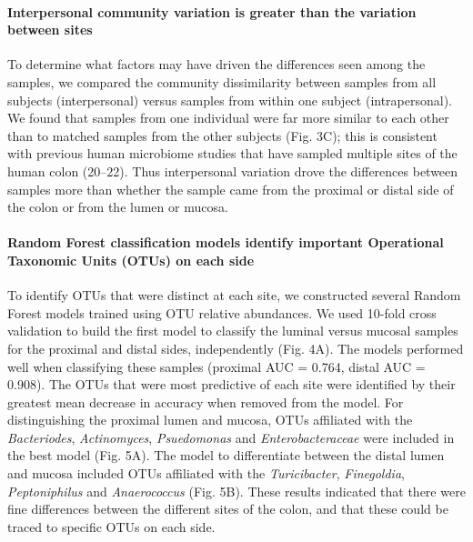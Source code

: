 \documentclass[12pt,]{article}
\let\oldparagraph\paragraph
\renewcommand{\paragraph}[1]{\oldparagraph{#1}\mbox{}}
\begin{document}
\paragraph{Interpersonal community variation is greater than the
variation between
sites}\label{interpersonal-community-variation-is-greater-than-the-variation-between-sites}

To determine what factors may have driven the differences seen among the
samples, we compared the community dissimilarity between samples from
all subjects (interpersonal) versus samples from within one subject
(intrapersonal). We found that samples from one individual were far more
similar to each other than to matched samples from the other subjects
(Fig. 3C); this is consistent with previous human microbiome studies
that have sampled multiple sites of the human colon (20--22). Thus
interpersonal variation drove the differences between samples more than
whether the sample came from the proximal or distal side of the colon or
from the lumen or mucosa.

\paragraph{Random Forest classification models identify important
Operational Taxonomic Units (OTUs) on each
side}\label{random-forest-classification-models-identify-important-operational-taxonomic-units-otus-on-each-side}

To identify OTUs that were distinct at each site, we constructed several
Random Forest models trained using OTU relative abundances. We used
10-fold cross validation to build the first model to classify the
luminal versus mucosal samples for the proximal and distal sides,
independently (Fig. 4A). The models performed well when classifying
these samples (proximal AUC = 0.764, distal AUC = 0.908). The OTUs that
were most predictive of each site were identified by their greatest mean
decrease in accuracy when removed from the model. For distinguishing the
proximal lumen and mucosa, OTUs affiliated with the \emph{Bacteriodes},
\emph{Actinomyces}, \emph{Psuedomonas} and \emph{Enterobacteraceae} were
included in the best model (Fig. 5A). The model to differentiate between
the distal lumen and mucosa included OTUs affiliated with the
\emph{Turicibacter}, \emph{Finegoldia}, \emph{Peptoniphilus} and
\emph{Anaerococcus} (Fig. 5B). These results indicated that there were
fine differences between the different sites of the colon, and that
these could be traced to specific OTUs on each side.
\end{document}
